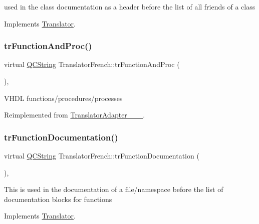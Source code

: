 used in the class documentation as a header before the list of all friends of a class 

Implements \mbox{\hyperlink{class_translator}{Translator}}.

\mbox{\label{class_translator_french_a97e2e1c5e8f8052a346386a6538ca709}} 
\subsubsection{\texorpdfstring{trFunctionAndProc()}{trFunctionAndProc()}}
{\footnotesize\ttfamily virtual \mbox{\hyperlink{class_q_c_string}{Q\+C\+String}} Translator\+French\+::tr\+Function\+And\+Proc (\begin{DoxyParamCaption}{ }\end{DoxyParamCaption})\hspace{0.3cm}{\ttfamily [inline]}, {\ttfamily [virtual]}}

V\+H\+DL functions/procedures/processes 

Reimplemented from \mbox{\hyperlink{class_translator_adapter__1__8__15}{Translator\+Adapter\+\_\+\_\+\_}}.

\mbox{\label{class_translator_french_a92d933a57c6d4a28df0b04308e551ed8}} 
\subsubsection{\texorpdfstring{trFunctionDocumentation()}{trFunctionDocumentation()}}
{\footnotesize\ttfamily virtual \mbox{\hyperlink{class_q_c_string}{Q\+C\+String}} Translator\+French\+::tr\+Function\+Documentation (\begin{DoxyParamCaption}{ }\end{DoxyParamCaption})\hspace{0.3cm}{\ttfamily [inline]}, {\ttfamily [virtual]}}

This is used in the documentation of a file/namespace before the list of documentation blocks for functions 

Implements \mbox{\hyperlink{class_translator}{Translator}}.

